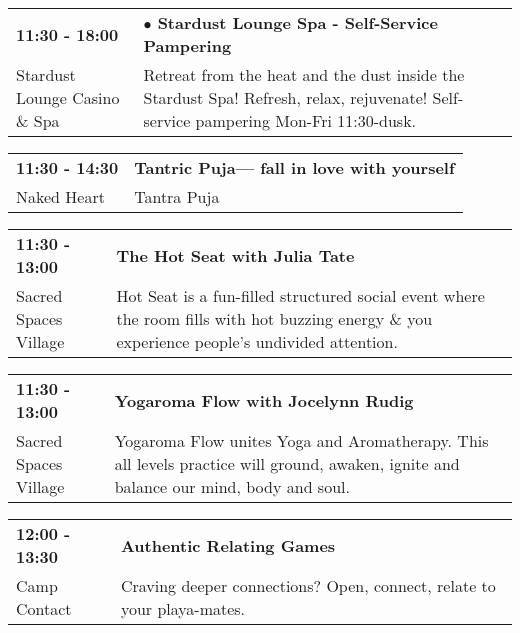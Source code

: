 \begin{tabular}{ p{1in} p{2.2in} }
    \textbf{11:30 - 18:00} & \textbf{$\bullet$	Stardust Lounge Spa - Self-Service Pampering} \\
    Stardust Lounge Casino \& Spa \newline  & Retreat from the heat and the dust inside the Stardust Spa! Refresh, relax, rejuvenate! Self-service pampering Mon-Fri 11:30-dusk. \\
    \hline 
\end{tabular}
    
\begin{tabular}{ p{1in} p{2.2in} }
    \textbf{11:30 - 14:30} & \textbf{Tantric Puja--- fall in love with yourself} \\
    Naked Heart \newline  & Tantra Puja \\
    \hline 
\end{tabular}
    
\begin{tabular}{ p{1in} p{2.2in} }
    \textbf{11:30 - 13:00} & \textbf{The Hot Seat with Julia Tate} \\
    Sacred Spaces Village \newline  & Hot Seat is a fun-filled structured social event where the room fills with hot buzzing energy \& you experience people's undivided attention. \\
    \hline 
\end{tabular}
    
\begin{tabular}{ p{1in} p{2.2in} }
    \textbf{11:30 - 13:00} & \textbf{Yogaroma Flow with Jocelynn Rudig} \\
    Sacred Spaces Village \newline  & Yogaroma Flow unites Yoga and Aromatherapy. This all levels practice will ground, awaken, ignite and balance our mind, body and soul. \\
    \hline 
\end{tabular}
    
\begin{tabular}{ p{1in} p{2.2in} }
    \textbf{12:00 - 13:30} & \textbf{Authentic Relating Games} \\
    Camp Contact \newline  & Craving deeper connections? Open, connect, relate to your playa-mates. \\
    \hline 
\end{tabular}
    
